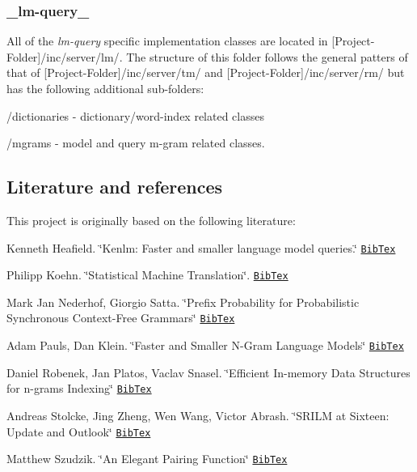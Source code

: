 \subsubsection*{\+\_\+lm-\/query\+\_\+}

All of the {\itshape lm-\/query} specific implementation classes are located in {\ttfamily \mbox{[}Project-\/\+Folder\mbox{]}/inc/server/lm/}. The structure of this folder follows the general patters of that of {\ttfamily \mbox{[}Project-\/\+Folder\mbox{]}/inc/server/tm/} and {\ttfamily \mbox{[}Project-\/\+Folder\mbox{]}/inc/server/rm/} but has the following additional sub-\/folders\+:


\begin{DoxyItemize}
\item {\ttfamily /dictionaries} -\/ dictionary/word-\/index related classes
\item {\ttfamily /mgrams} -\/ model and query m-\/gram related classes.
\end{DoxyItemize}

\subsection*{Literature and references}

This project is originally based on the following literature\+:


\begin{DoxyItemize}
\item Kenneth Heafield. \char`\"{}\+Kenlm\+: Faster and smaller language model queries.\char`\"{} \href{./docs/bibtex/Heafield_WMT11.bib}{\tt Bib\+Tex}
\item Philipp Koehn. \char`\"{}\+Statistical Machine Translation\char`\"{}. \href{./docs/bibtex/Koehn_SMT_Book10.bib}{\tt Bib\+Tex}
\item Mark Jan Nederhof, Giorgio Satta. \char`\"{}\+Prefix Probability for Probabilistic Synchronous Context-\/\+Free Grammars\char`\"{} \href{./docs/bibtex/NederhofSatta_NLP11.bib}{\tt Bib\+Tex}
\item Adam Pauls, Dan Klein. \char`\"{}\+Faster and Smaller N-\/\+Gram Language Models\char`\"{} \href{./docs/bibtex/PaulsKlein_ACL11.bib}{\tt Bib\+Tex}
\item Daniel Robenek, Jan Platos, Vaclav Snasel. \char`\"{}\+Efficient In-\/memory Data Structures for n-\/grams Indexing\char`\"{} \href{./docs/bibtex/RobenekPlatosSnasel_DATESO13.bib}{\tt Bib\+Tex}
\item Andreas Stolcke, Jing Zheng, Wen Wang, Victor Abrash. \char`\"{}\+S\+R\+I\+L\+M at Sixteen\+: Update and Outlook\char`\"{} \href{./docs/bibtex/StolckeZhengWangAbrash_ASRU11.bib}{\tt Bib\+Tex}
\item Matthew Szudzik. \char`\"{}\+An Elegant Pairing Function\char`\"{} \href{./docs/bibtex/Szudzik_NKS06.bib}{\tt Bib\+Tex}
\end{DoxyItemize}

